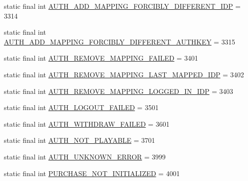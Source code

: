 \begin{DoxyCompactItemize}
\item 
static final int \hyperlink{classcom_1_1toast_1_1android_1_1gamebase_1_1base_1_1_gamebase_error_aec32b6c6a8eec5f0cdeeeafebf9108b4}{A\+U\+T\+H\+\_\+\+A\+D\+D\+\_\+\+M\+A\+P\+P\+I\+N\+G\+\_\+\+F\+O\+R\+C\+I\+B\+L\+Y\+\_\+\+D\+I\+F\+F\+E\+R\+E\+N\+T\+\_\+\+I\+DP} = 3314
\item 
static final int \hyperlink{classcom_1_1toast_1_1android_1_1gamebase_1_1base_1_1_gamebase_error_af9bcd68903b375f36de33992421dcde6}{A\+U\+T\+H\+\_\+\+A\+D\+D\+\_\+\+M\+A\+P\+P\+I\+N\+G\+\_\+\+F\+O\+R\+C\+I\+B\+L\+Y\+\_\+\+D\+I\+F\+F\+E\+R\+E\+N\+T\+\_\+\+A\+U\+T\+H\+K\+EY} = 3315
\item 
static final int \hyperlink{classcom_1_1toast_1_1android_1_1gamebase_1_1base_1_1_gamebase_error_a3396dd65877a836362332aaad021dfad}{A\+U\+T\+H\+\_\+\+R\+E\+M\+O\+V\+E\+\_\+\+M\+A\+P\+P\+I\+N\+G\+\_\+\+F\+A\+I\+L\+ED} = 3401
\item 
static final int \hyperlink{classcom_1_1toast_1_1android_1_1gamebase_1_1base_1_1_gamebase_error_a20e46fe27702edff6e2bc56cb59ca4a1}{A\+U\+T\+H\+\_\+\+R\+E\+M\+O\+V\+E\+\_\+\+M\+A\+P\+P\+I\+N\+G\+\_\+\+L\+A\+S\+T\+\_\+\+M\+A\+P\+P\+E\+D\+\_\+\+I\+DP} = 3402
\item 
static final int \hyperlink{classcom_1_1toast_1_1android_1_1gamebase_1_1base_1_1_gamebase_error_adf44b4db7395f2d9cff124f885903f60}{A\+U\+T\+H\+\_\+\+R\+E\+M\+O\+V\+E\+\_\+\+M\+A\+P\+P\+I\+N\+G\+\_\+\+L\+O\+G\+G\+E\+D\+\_\+\+I\+N\+\_\+\+I\+DP} = 3403
\item 
static final int \hyperlink{classcom_1_1toast_1_1android_1_1gamebase_1_1base_1_1_gamebase_error_a6824bf2046e155715a78a7658bd28c3b}{A\+U\+T\+H\+\_\+\+L\+O\+G\+O\+U\+T\+\_\+\+F\+A\+I\+L\+ED} = 3501
\item 
static final int \hyperlink{classcom_1_1toast_1_1android_1_1gamebase_1_1base_1_1_gamebase_error_a480a18982a957f4f9a8d00f0500a08ff}{A\+U\+T\+H\+\_\+\+W\+I\+T\+H\+D\+R\+A\+W\+\_\+\+F\+A\+I\+L\+ED} = 3601
\item 
static final int \hyperlink{classcom_1_1toast_1_1android_1_1gamebase_1_1base_1_1_gamebase_error_a2295d6ef3c13d3aa1eba8c6cb7b70a76}{A\+U\+T\+H\+\_\+\+N\+O\+T\+\_\+\+P\+L\+A\+Y\+A\+B\+LE} = 3701
\item 
static final int \hyperlink{classcom_1_1toast_1_1android_1_1gamebase_1_1base_1_1_gamebase_error_a3c25651751bd65f6b97b00b4a3bfa59c}{A\+U\+T\+H\+\_\+\+U\+N\+K\+N\+O\+W\+N\+\_\+\+E\+R\+R\+OR} = 3999
\item 
static final int \hyperlink{classcom_1_1toast_1_1android_1_1gamebase_1_1base_1_1_gamebase_error_a6402187d8ebc1adc1ed73f178dbb5e9f}{P\+U\+R\+C\+H\+A\+S\+E\+\_\+\+N\+O\+T\+\_\+\+I\+N\+I\+T\+I\+A\+L\+I\+Z\+ED} = 4001

\end{DoxyCompactItemize}
